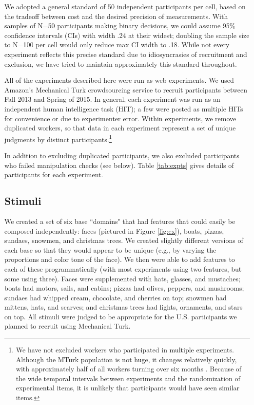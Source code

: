 \documentclass[man,noapacite]{apa2}
\begin{document}
We adopted a general standard of 50 independent participants per cell, based on the tradeoff between cost and the desired precision of measurements. With samples of N=50 participants making binary decisions, we could assume 95\% confidence intervals (CIs) with width .24 at their widest; doubling the sample size to N=100 per cell would only reduce max CI width to .18. While not every experiment reflects this precise standard due to idiosyncrasies of recruitment and exclusion, we have tried to maintain approximately this standard throughout.

All of the experiments described here were run as web experiments. We used Amazon's Mechanical Turk crowdsourcing service to recruit participants between Fall 2013 and Spring of 2015. In general, each experiment was run as an independent human intelligence task (HIT); a few were posted as multiple HITs for convenience or due to experimenter error. Within experiments, we remove duplicated workers, so that data in each experiment represent a set of unique judgments by distinct participants.\footnote{We have not excluded workers who participated in multiple experiments. Although the MTurk population is not huge, it changes relatively quickly, with approximately half of all workers turning over six months \cite{stewart2015}. Because of the wide temporal intervals between experiments and the randomization of experimental items, it is unlikely that participants would have seen similar items.}

In addition to excluding duplicated participants, we also excluded participants who failed manipulation checks (see below). Table \ref{tab:expts} gives details of participants for each experiment.

\subsection{Stimuli}

We created a set of six base ``domains" that had features that could easily be composed independently: faces (pictured in Figure \ref{fig:ex}), boats, pizzas, sundaes, snowmen, and christmas trees. We created slightly different versions of each base so that they would appear to be unique (e.g., by varying the proportions and color tone of the face). We then were able to add features to each of these programmatically (with most experiments using two features, but some using three). Faces were supplemented with hats, glasses, and mustaches; boats had motors, sails, and cabins; pizzas had olives, peppers, and mushrooms; sundaes had whipped cream, chocolate, and cherries on top; snowmen had mittens, hats, and scarves; and christmas trees had lights, ornaments, and stars on top. All stimuli were judged to be appropriate for the U.S. participants we planned to recruit using Mechanical Turk.
\end{document}
